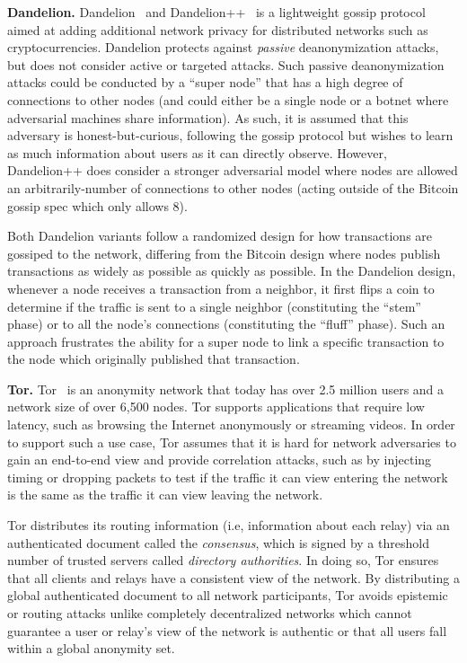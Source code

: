 \documentclass{article}
\begin{document}
\textbf{Dandelion.}
Dandelion~\cite{BojjaVenkatakrishnan:2017:DRB} and
Dandelion++~\cite{Fanti:2018:DLC} is a lightweight gossip protocol aimed at
adding additional network privacy for
distributed networks such as cryptocurrencies. Dandelion protects against
\emph{passive}
deanonymization attacks, but does not consider active or targeted attacks. Such
passive deanonymization attacks could be conducted by a ``super node'' that has
a high degree of connections to other nodes (and could either be a single node
or a botnet where adversarial machines share information). As such, it is
assumed that this adversary is honest-but-curious, following the gossip protocol
but wishes to learn as much information about users as it can directly observe.
However, Dandelion++ does consider a stronger adversarial model where nodes are
allowed an arbitrarily-number of connections to other nodes (acting outside of the
Bitcoin gossip spec which only allows 8).

Both Dandelion variants follow a randomized design for how transactions are
gossiped to the network, differing from the Bitcoin design where nodes publish
transactions as widely as possible as quickly as possible. In the Dandelion
design, whenever a node receives a transaction from a neighbor, it
first flips a coin to determine if the traffic is sent to a single
neighbor (constituting the ``stem'' phase) or to all the node's connections
(constituting the ``fluff'' phase). Such an approach frustrates the ability for
a super node to link a specific transaction to the node which originally
published that transaction.


\textbf{Tor.}
Tor~\cite{tor-specification} is an anonymity network that today has over 2.5
million users and a network
size of over 6,500 nodes. Tor supports applications that require low latency,
such as browsing the Internet anonymously or streaming videos. In order to
support such a use case, Tor assumes that it is hard for network adversaries to
gain an end-to-end view and provide correlation attacks, such as by injecting
timing or dropping packets to test if the traffic it can view entering the
network is the same as the traffic it can view leaving the network.

Tor distributes its routing information (i.e, information about each relay) via
an authenticated document called the \emph{consensus}, which is signed by a
threshold number of trusted servers called \emph{directory authorities}. In
doing so, Tor ensures that all clients and relays have a consistent view of the
network. By distributing a global authenticated document to all network
participants, Tor avoids epistemic or routing attacks unlike completely
decentralized networks which cannot guarantee a user or relay's view of the
network is authentic or that all users fall within a global anonymity set.
\end{document}
